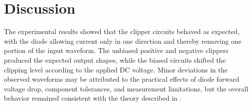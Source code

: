 \section{Discussion}

The experimental results showed that the clipper circuits behaved as expected, with the diode allowing current only in one direction and thereby removing one portion of the input waveform. The unbiased positive and negative clippers produced the expected output shapes, while the biased circuits shifted the clipping level according to the applied DC voltage. Minor deviations in the observed waveforms may be attributed to the practical effects of diode forward voltage drop, component tolerances, and measurement limitations, but the overall behavior remained consistent with the theory described in \cite{lab_05_boylstad}.

